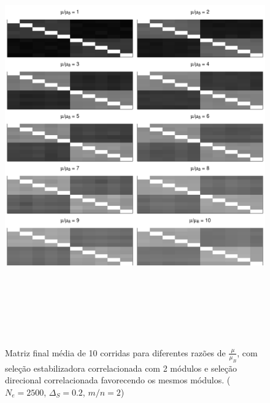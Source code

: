 \begin{center}
\begin{figure}[htbp]
  \includegraphics[width=150mm, height=180mm]{figuras/MatBDirecRMu}
   \caption{Matriz final média de 10 corridas para diferentes razões de
   $\frac{\mu}{\mu_B}$, com seleção estabilizadora correlacionada com 2
   módulos e seleção direcional correlacionada favorecendo os mesmos
   módulos. ($N_e=2500$, $\Delta_S=0.2$, $m/n=2$)}
  \label{MatBDirecional-RMu}
\end{figure}
\end{center}

